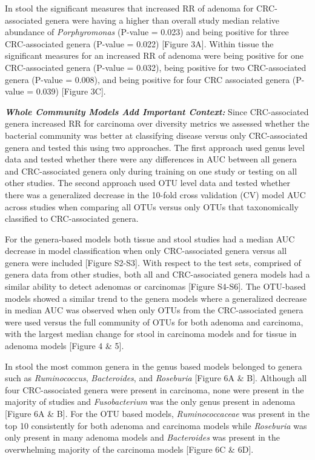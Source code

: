 \documentclass[12pt,]{article}
\begin{document}
In stool the significant measures that increased RR of adenoma for
CRC-associated genera were having a higher than overall study median
relative abundance of \emph{Porphyromonas} (P-value = 0.023) and being
positive for three CRC-associated genera (P-value = 0.022) {[}Figure
3A{]}. Within tissue the significant measures for an increased RR of
adenoma were being positive for one CRC-associated genera (P-value =
0.032), being positive for two CRC-associated genera (P-value = 0.008),
and being positive for four CRC associated genera (P-value = 0.039)
{[}Figure 3C{]}.

\textbf{\emph{Whole Community Models Add Important Context:}} Since
CRC-associated genera increased RR for carcinoma over diversity metrics
we assessed whether the bacterial community was better at classifying
disease versus only CRC-associated genera and tested this using two
approaches. The first approach used genus level data and tested whether
there were any differences in AUC between all genera and CRC-associated
genera only during training on one study or testing on all other
studies. The second approach used OTU level data and tested whether
there was a generalized decrease in the 10-fold cross validation (CV)
model AUC across studies when comparing all OTUs versus only OTUs that
taxonomically classified to CRC-associated genera.

For the genera-based models both tissue and stool studies had a median
AUC decrease in model classification when only CRC-associated genera
versus all genera were included {[}Figure S2-S3{]}. With respect to the
test sets, comprised of genera data from other studies, both all and
CRC-associated genera models had a similar ability to detect adenomas or
carcinomas {[}Figure S4-S6{]}. The OTU-based models showed a similar
trend to the genera models where a generalized decrease in median AUC
was observed when only OTUs from the CRC-associated genera were used
versus the full community of OTUs for both adenoma and carcinoma, with
the largest median change for stool in carcinoma models and for tissue
in adenoma models {[}Figure 4 \& 5{]}.

In stool the most common genera in the genus based models belonged to
genera such as \emph{Ruminococcus}, \emph{Bacteroides}, and
\emph{Roseburia} {[}Figure 6A \& B{]}. Although all four CRC-associated
genera were present in carcinoma, none were present in the majority of
studies and \emph{Fusobacterium} was the only genus present in adenoma
{[}Figure 6A \& B{]}. For the OTU based models, \emph{Ruminococcaceae}
was present in the top 10 consistently for both adenoma and carcinoma
models while \emph{Roseburia} was only present in many adenoma models
and \emph{Bacteroides} was present in the overwhelming majority of the
carcinoma models {[}Figure 6C \& 6D{]}.
\end{document}
